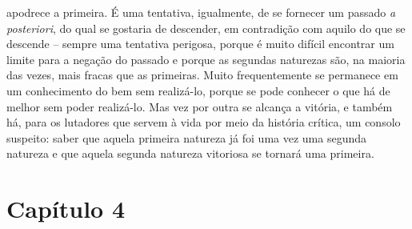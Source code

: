 apodrece a primeira. É uma tentativa, igualmente, de se fornecer um
passado \emph{a posteriori}, do qual se gostaria de descender, em
contradição com aquilo do que se descende -- sempre uma tentativa
perigosa, porque é muito difícil encontrar um limite para a negação do
passado e porque as segundas naturezas são, na maioria das vezes, mais
fracas que as primeiras. Muito frequentemente se permanece em um
conhecimento do bem sem realizá-lo, porque se pode conhecer o que há de
melhor sem poder realizá-lo. Mas vez por outra se alcança a vitória, e
também há, para os lutadores que servem à vida por meio da história
crítica, um consolo suspeito: saber que aquela primeira natureza já foi
uma vez uma segunda natureza e que aquela segunda natureza vitoriosa se
tornará uma primeira.

  \chapter{Capítulo 4}\label{capuxedtulo-4}

